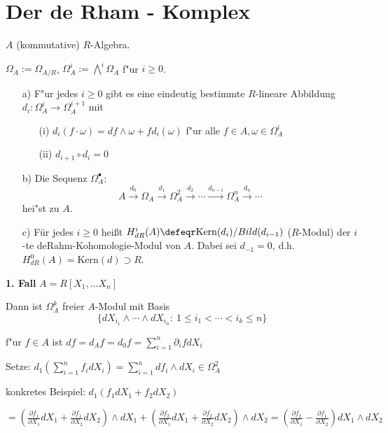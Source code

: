 \section{Der de Rham - Komplex}

$A$ (kommutative) $R$-Algebra.

$\Omega_A := \Omega_{A/R}$, $\Omega^i_A := \bigwedge\nolimits^i\Omega_A$ f"ur $i \geq 0$.

\begin{SatzDef}
\begin{enumerate}
\item[a)] F"ur jedes $i \geq 0$ gibt es eine eindeutig bestimmte $R$-lineare Abbildung $d_i : \Omega^i_A \rightarrow \Omega^{i+1}_A$ mit
\begin{enumerate}
\item[(i)] $d_i(f \cdot \omega) = df \wedge \omega + f d_i(\omega)$ f"ur alle $f \in A, \omega \in \Omega^i_A$
\item[(ii)] $d_{i+1} \circ d_i = 0$
\end{enumerate}

\item[b)]
Die Sequenz $\Omega^\bullet_A$:
$$A \overset{d_0}{\rightarrow} \Omega_A \overset{d_1}{\rightarrow} \Omega^2_A \overset{d_2}{\rightarrow} \cdots \overset{d_{n-1}}{\rightarrow} \Omega^n_A  \overset{d_n}{\rightarrow} \cdots$$
hei"st  zu $A$.

\item[c)]
F\"ur jedes $i\geq 0$ hei\ss t $H_{dR}^i(A)\defeqr \textrm{Kern}(d_i)/Bild(d_{i-1})$ ($R$-Modul)
der $i$-te deRahm-Kohomologie-Modul von $A$. Dabei sei $d_{-1}=0$, d.h. $H_{dR}^0(A)=\textrm{Kern}(d)\supset R$.

\end{enumerate}

\begin{Bew}
\textbf{1. Fall} $A = R[X_1, \ldots X_n]$

Dann ist $\Omega^k_A$ freier $A$-Modul mit Basis
\[
\{d X_{i_1} \wedge \cdots \wedge d X_{i_n}:\ 1 \leq i_1 < \cdots < i_k \leq n\}
\]

f"ur $f \in A$ ist $df = d_A f = d_0 f = \sum_{i=1}^n \partial_i f d X_i$

Setze: $d_1(\sum_{i=1}^n f_i d X_i) = \sum_{i=1}^n d f_i \wedge d X_i \in \Omega^2_A$

konkretes Beispiel: $d_1(f_1 dX_1 + f_2 dX_2)$

$= (\frac{\partial f_1}{\partial X_1} dX_1 + \frac{\partial f_1}{\partial X_2} dX_2) \wedge dX_1 + (\frac{\partial f_2}{\partial X_1} dX_1 + \frac{\partial f_2}{\partial X_2} dX_2) \wedge dX_2 = (\frac{\partial f_2}{\partial X_1} - \frac{\partial f_1}{\partial X_2}) dX_1 \wedge dX_2$


\end{Bew}
\end{SatzDef}
